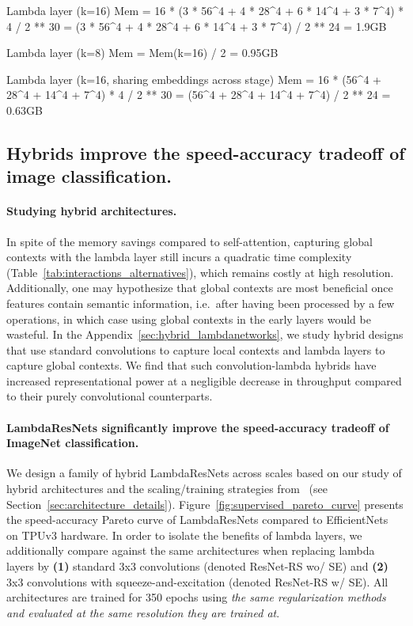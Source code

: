 \documentclass{article} \usepackage{iclr2021_conference,times}
\begin{document}
Lambda layer (k=16)
Mem = 16 * (3 * 56^4 + 4 * 28^4 + 6 * 14^4 + 3 * 7^4) * 4 / 2 ** 30
    = (3 * 56^4 + 4 * 28^4 + 6 * 14^4 + 3 * 7^4) / 2 ** 24
    = 1.9GB 

Lambda layer (k=8)
Mem = Mem(k=16) / 2 =  0.95GB

Lambda layer (k=16, sharing embeddings across stage)
Mem = 16 * (56^4 + 28^4 + 14^4 + 7^4) * 4 / 2 ** 30
    = (56^4 + 28^4 + 14^4 + 7^4) / 2 ** 24
    = 0.63GB
\fi

\subsection{Hybrids improve the speed-accuracy tradeoff of image classification.\label{sec:hybrid_lambdanetworks}}

\vspace{-0.1cm}
\paragraph{Studying hybrid architectures.}
In spite of the memory savings compared to self-attention, capturing global contexts with the lambda layer still incurs a quadratic time complexity (Table~\ref{tab:interactions_alternatives}), which remains costly at high resolution. 
Additionally, one may hypothesize that global contexts are most beneficial once features contain semantic information, i.e.\ after having been processed by a few operations, in which case using global contexts in the early layers would be wasteful.
In the Appendix~\ref{sec:hybrid_lambdanetworks}, we study hybrid designs that use standard convolutions to capture local contexts and lambda layers to capture global contexts.
We find that such convolution-lambda hybrids have increased representational power at a negligible decrease in throughput compared to their purely convolutional counterparts.

\vspace{-0.1cm}
\paragraph{LambdaResNets significantly improve the speed-accuracy tradeoff of ImageNet classification.}
We design a family of hybrid LambdaResNets across scales based on our study of hybrid architectures and the scaling/training strategies from~\cite{bello2021revisiting} (see Section~\ref{sec:architecture_details}).
Figure~\ref{fig:supervised_pareto_curve} presents the speed-accuracy Pareto curve of LambdaResNets compared to EfficientNets~\citep{tan2019efficientnet} on TPUv3 hardware.
In order to isolate the benefits of lambda layers, we additionally compare against the same architectures when replacing lambda layers by \textbf{(1)} standard 3x3 convolutions (denoted ResNet-RS wo/ SE) and \textbf{(2)} 3x3 convolutions with squeeze-and-excitation (denoted ResNet-RS w/ SE).
All architectures are trained for 350 epochs using \emph{the same regularization methods and evaluated at the same resolution they are trained at}.
\end{document}

